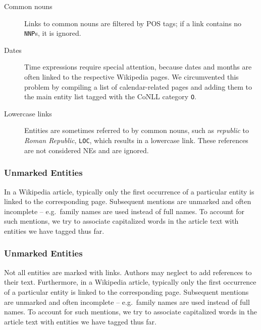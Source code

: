 \documentclass[11pt]{article}
\begin{document}
\begin{description}
\item[Common nouns] Links to common nouns are filtered by POS tags; if a link contains no \texttt{NNP}s, it is ignored.
\item[Dates] Time expressions require special attention, because dates and months are often linked to the respective Wikipedia pages. We circumvented this problem by compiling a list of calendar-related pages and adding them to the main entity list tagged with the CoNLL category \texttt{O}. 
\item[Lowercase links] Entities are sometimes referred to by common nouns, such as \textit{republic} to \textit{Roman Republic}, \texttt{LOC}, which results in a lowercase link. These references are not considered NEs and are ignored.
\end{description}

\subsubsection{Unmarked Entities}

In a Wikipedia article, typically only the first occurrence of a particular entity is linked to the corresponding page. Subsequent mentions are unmarked and often incomplete -- e.g.~family names are used instead of full names. To account for such mentions, we try to associate capitalized words in the article text with entities we have tagged thus far.

\subsubsection{Unmarked Entities}

Not all entities are marked with links. Authors may neglect to add references to their text. Furthermore, in a Wikipedia article, typically only the first occurrence of a particular entity is linked to the corresponding page. Subsequent mentions are unmarked and often incomplete -- e.g.~family names are used instead of full names. To account for such mentions, we try to associate capitalized words in the article text with entities we have tagged thus far.
\end{document}
